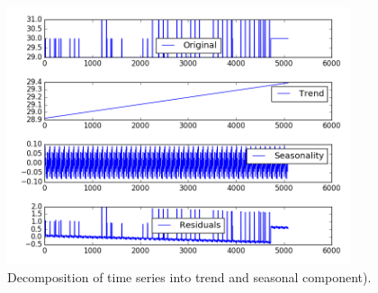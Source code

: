 \documentclass[12pt]{article}
\begin{document}
\begin{figure}
\includegraphics[width=0.9\textwidth]{11506/decomposition.png}
\caption{Decomposition of time series into trend and seasonal component).} \label{fg:decomp}
\end{figure}
\end{document}
